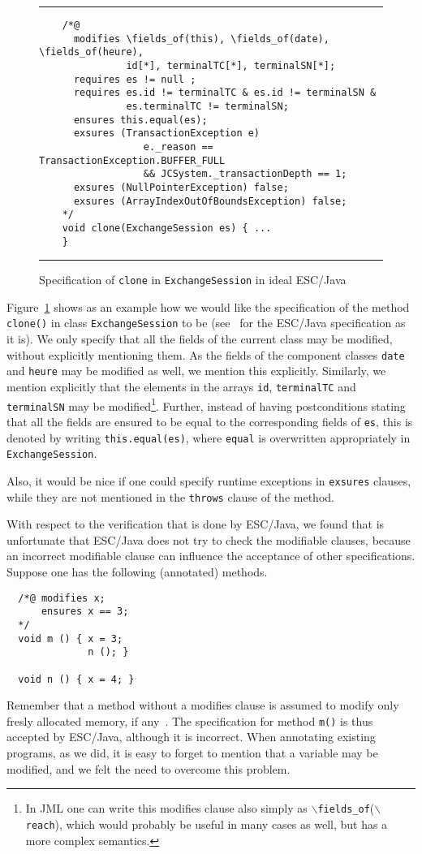 \documentclass[a4paper]{llncs}
\newcommand{\fieldsof}{\(\backslash\)\texttt{fields\_of}}
\newcommand{\reach}{\(\backslash\)\texttt{reach}}
\begin{document}
\begin{figure}[tbh]
\rule{\linewidth}{0.3mm}
\begin{verbatim}
    /*@
      modifies \fields_of(this), \fields_of(date), \fields_of(heure),
               id[*], terminalTC[*], terminalSN[*];
      requires es != null ;
      requires es.id != terminalTC & es.id != terminalSN &
               es.terminalTC != terminalSN;
      ensures this.equal(es);
      exsures (TransactionException e) 
                  e._reason == TransactionException.BUFFER_FULL 
                  && JCSystem._transactionDepth == 1; 
      exsures (NullPointerException) false;
      exsures (ArrayIndexOutOfBoundsException) false;
    */
    void clone(ExchangeSession es) { ...
    } 
\end{verbatim}
\caption{Specification of \texttt{clone} in \texttt{ExchangeSession}
in ideal ESC/Java}
\label{FigIdealESC}
\rule{\linewidth}{0.3mm}
\end{figure}

Figure~\ref{FigIdealESC} shows as an example how we would like the
specification of the method \texttt{clone()} in class
\texttt{ExchangeSession} to be (see~\cite{CatanoH01Url} for the
ESC/Java specification as it is). We only specify that all the fields
of the current class may be modified, without explicitly mentioning
them. As the fields of the component classes \texttt{date} and
\texttt{heure} may be modified as well, we mention this
explicitly. Similarly, we mention explicitly that the elements in the
arrays \texttt{id}, \texttt{terminalTC} and \texttt{terminalSN} may be
modified\footnote{In JML one can write this modifies clause also
simply as \fieldsof(\reach), which would probably be useful in many
cases as well, but has a more complex semantics.}. Further, instead of
having postconditions stating that all the fields are ensured to be
equal to the corresponding fields of \texttt{es}, this is denoted by
writing \texttt{this.equal(es)}, where \texttt{equal} is overwritten
appropriately in \texttt{ExchangeSession}.

Also, it would be nice if one could specify runtime exceptions in
\texttt{exsures} clauses, while they are not mentioned in the
\texttt{throws} clause of the method.

With respect to the verification that is done by ESC/Java, we found
that is unfortunate that ESC/Java does not try to check the modifiable 
clauses, because an incorrect modifiable clause can influence the 
acceptance of other specifications. Suppose one has the following
(annotated) methods.
\begin{verbatim}
  /*@ modifies x;
      ensures x == 3;
  */
  void m () { x = 3;
              n (); }

  void n () { x = 4; }
\end{verbatim}
Remember that a method without a modifies clause is assumed to modify
only fresly allocated memory, if any~\cite{LeinoNS00}. The
specification for method \texttt{m()} is thus accepted by ESC/Java,
although it is incorrect. When annotating existing programs, as we
did, it is easy to forget to mention that a variable may be modified,
and we felt the need to overcome this problem.
\end{document}
